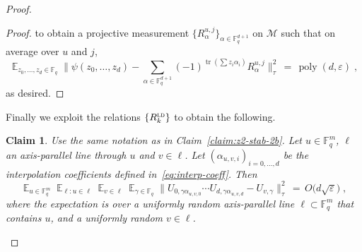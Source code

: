 \documentclass[11pt]{article}
\newtheorem{claim}[theorem]{Claim}
\theoremstyle{definition}
\DeclareMathOperator*{\Expectation}{\mathbb{E}}
\newcommand{\Es}[1]{\Expectation_{#1}}
\newcommand{\F}{\ensuremath{\mathbb{F}}}
\newcommand{\ld}{\textsc{ld}}
\newcommand{\Z}{\ensuremath{\mathbb{Z}}}
\newcommand{\mM}{\ensuremath{\mathcal{M}}}
\DeclareMathOperator{\poly}{poly}
\newcommand{\eps}{\varepsilon}
\DeclareMathOperator{\tr}{tr}
\begin{document}
\begin{proof}
\begin{proof}
to obtain a projective measurement $\{R^{u,j}_\alpha\}_{\alpha\in \F_q^{d+1}}$  on $\mM$ such that %
on average over $u$ and $j$,
\[  \Es{z_0,\ldots,z_{d}\in\F_q} \Big\| \psi(z_0,\ldots,z_{d}) -  \sum_{\alpha\in \F_q^{d+1}} (-1)^{\tr(\sum z_i\alpha_i)} R_\alpha^{u,j}\Big\|_\tau^2 \,=\, \poly(d,\eps)\;,\]
as desired. 
\end{proof}



Finally we exploit the relations $\{R^\ld_k\}$ to obtain the following. 

\begin{claim}\label{claim:z2-stab-5}
Use the same notation as in Claim~\ref{claim:z2-stab-2b}. Let $u\in \F_q^m$, $\ell$ an axis-parallel line through $u$ and $v\in\ell$. Let $(\alpha_{u,v,i})_{i=0,\ldots,d}$ be the interpolation coefficients defined in~\eqref{eq:interp-coeff}. %
Then 
\begin{equation}\label{eq:z2-stab-5-0}
\Es{u\in\F_q^m} \Es{\ell: u\in \ell} \Es{v\in \ell} \Es{\gamma\in\F_q} \Big\| U_{0,\gamma \alpha_{u,v,0}}\cdots U_{d,\gamma  \alpha_{u,v,d}} - U_{v,\gamma} \big\|_\tau^2 \,=\, O\big(d\sqrt{\eps}\big)\;,
\end{equation}
where the expectation is over a uniformly random axis-parallel line $\ell\subset\F_q^m$ that contains $u$, and a uniformly random $v\in\ell$. 
\end{claim}


\end{proof}
\end{document}
